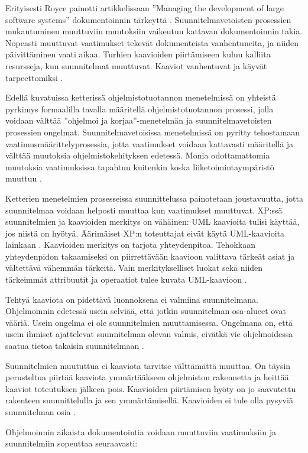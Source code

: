 \documentclass[finnish]{tktltiki2}
\theoremstyle{definition}
\theoremstyle{remark}
\begin{document}
Erityisesti Royce painotti artikkelissaan ''Managing the development of large software systems'' dokumentoinnin tärkeyttä \cite{ROY70}. Suunnitelmavetoisten prosessien mukautuminen muuttuviin muutoksiin vaikeutuu kattavan dokumentoinnin takia. Nopeasti muuttuvat vaatimukset tekevät dokumenteista vanhentuneita, ja niiden päivittäminen vaati aikaa. Turhien kaavioiden piirtämiseen kuluu kalliita resursseja, kun suunnitelmat muuttuvat. Kaaviot vanhentuvat ja käyvät tarpeettomiksi \cite{FOW01b}.

Edellä kuvatuissa ketterissä ohjelmistotuotannon menetelmissä on yhteistä pyrkimys formaalilla tavalla määritellä ohjelmistotuotannon prosessi, jolla voidaan välttää ''ohjelmoi ja korjaa''-menetelmän ja suunnitelmavetoisten prosessien ongelmat. Suunnitelmavetoisissa menetelmissä on pyritty tehostamaan vaatimusmäärittelyprosessia, jotta vaatimukset voidaan kattavasti määritellä ja välttää muutoksia ohjelmistokehityksen edetessä. Monia odottamattomia muutoksia vaatimuksissa tapahtuu kuitenkin koska liiketoimintaympäristö muuttuu \cite{FOW01b}.

Ketterien menetelmien prosesseissa suunnittelussa painotetaan joustavuutta, jotta suunnitelmaa voidaan helposti muuttaa kun vaatimukset muuttuvat. XP:ssä suunnitelmien ja kaavioiden merkitys on vähäinen: UML kaavioita tulisi käyttää, jos niistä on hyötyä. Äärimäiset XP:n toteuttajat eivät käytä UML-kaavioita lainkaan \cite{FOW01b}. Kaavioiden merkitys on tarjota yhteydenpitoa. Tehokkaan yhteydenpidon takaamiseksi on piirrettävään kaavioon valittava tärkeät asiat ja vältettävä vähemmän tärkeitä. Vain merkitykselliset luokat sekä niiden tärkeimmät attribuutit ja operaatiot tulee kuvata UML-kaavioon \cite{FOW01b}.

Tehtyä kaaviota on pidettävä luonnoksena ei valmiina suunnitelmana. Ohjelmoinnin edetessä usein selviää, että jotkin suunnitelman osa-alueet ovat vääriä. Usein ongelma ei ole suunnitelmien muuttamisessa. Ongelmana on, että usein ihmiset ajattelevat suunnitelman olevan valmis, eivätkä vie ohjelmoidessa saatua tietoa takaisin suunnitelmaan \cite{FOW01b}. 

Suunnitelmien muututtua ei kaaviota tarvitse välttämättä muuttaa. On täysin perusteltua piirtää kaaviota ymmärtääkseen ohjelmiston rakennetta ja heittää kaaviot toteutuksen jälkeen pois. Kaavioiden piirtämisen hyöty on jo saavutettu rakenteen suunnittelulla ja sen ymmärtämisellä. Kaavioiden ei tule olla pysyviä suunnitelman osia \cite{FOW01b}.

Ohjelmoinnin aikaista dokumentointia voidaan muuttuviin vaatimuksiin ja suunnitelmiin sopeuttaa seuraavasti:
\end{document}
